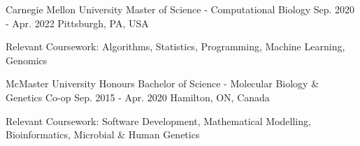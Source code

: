 \begin{cventries}
   \cventry
   {Carnegie Mellon University}
       {Master of Science - Computational Biology}
       {Sep. 2020 - Apr. 2022}
       {Pittsburgh, PA, USA} %
       {\begin{cvitems}
          \item{Relevant Coursework: Algorithms, Statistics, Programming, Machine Learning, Genomics}
        \end{cvitems}
       }
   \cventry
       {McMaster University}
       {Honours Bachelor of Science - Molecular Biology \& Genetics Co-op}
       {Sep. 2015 - Apr. 2020}
       {Hamilton, ON, Canada} %
       {\begin{cvitems}
           \item{Relevant Coursework: Software Development, Mathematical Modelling, Bioinformatics, Microbial \& Human Genetics}
        \end{cvitems}
       }
\end{cventries}
